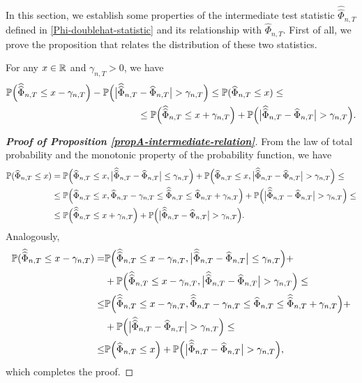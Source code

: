 \documentclass[a4paper,12pt]{article}
\newcommand{\doublehattwo}[1]{\widehat{\widehat{#1}}}
\begin{document}
In this section, we establish some properties of the intermediate test statistic $\doublehattwo{\Phi}_{n,T}$ defined in \eqref{Phi-doublehat-statistic} and its relationship with $\widehat{\Phi}_{n, T}$. First of all, we prove the proposition that relates the distribution of these two statistics.


\begin{propA}\label{propA-intermediate-relation}
For any $x \in \mathbb{R}$ and $\gamma_{n, T} > 0$, we have
\begin{align*} \pr\Big(\doublehattwo{\Phi}_{n,T} \le x - \gamma_{n, T}\Big) - \pr \Big(\big|\doublehattwo{\Phi}_{n,T} &- \widehat{\Phi}_{n,T}\big| > \gamma_{n, T} \Big)\le \pr(\widehat{\Phi}_{n, T} \le x) \le \\
&\le\pr\Big(\doublehattwo{\Phi}_{n,T} \le x + \gamma_{n, T}\Big) + \pr \Big(\big|\doublehattwo{\Phi}_{n,T} - \widehat{\Phi}_{n,T}\big| > \gamma_{n, T} \Big).
\end{align*}
\end{propA}

\begin{proof}[\textnormal{\textbf{Proof of Proposition \ref{propA-intermediate-relation}}}] 
From the law of total probability and the monotonic property of the probability function, we have
\begin{align*} \pr(\widehat{\Phi}_{n, T} \le x) &= \pr \Big(\widehat{\Phi}_{n, T} \le x, \big|\doublehattwo{\Phi}_{n,T} - \widehat{\Phi}_{n,T}\big| \le \gamma_{n, T} \Big) + \pr \Big(\widehat{\Phi}_{n, T} \le x, \big|\doublehattwo{\Phi}_{n,T} - \widehat{\Phi}_{n,T}\big| > \gamma_{n, T} \Big) \le \\
& \le  \pr \Big(\widehat{\Phi}_{n, T} \le x, \widehat{\Phi}_{n,T} - \gamma_{n, T} \le \doublehattwo{\Phi}_{n,T} \le \widehat{\Phi}_{n,T} + \gamma_{n, T} \Big) + \pr \Big(\big|\doublehattwo{\Phi}_{n,T} - \widehat{\Phi}_{n,T}\big| > \gamma_{n, T} \Big) \le \\
& \le  \pr \Big(\doublehattwo{\Phi}_{n,T} \le x + \gamma_{n, T} \Big) + \pr \Big(\big|\doublehattwo{\Phi}_{n,T} - \widehat{\Phi}_{n,T}\big| > \gamma_{n, T} \Big).
\end{align*}
Analogously, 
\begin{align*} \pr(\doublehattwo{\Phi}_{n, T} \le x - \gamma_{n, T}) =& \pr \Big(\doublehattwo{\Phi}_{n, T} \le x - \gamma_{n, T}, \big|\doublehattwo{\Phi}_{n,T} - \widehat{\Phi}_{n,T}\big| \le \gamma_{n, T} \Big) +\\
&+ \pr \Big(\doublehattwo{\Phi}_{n, T} \le x - \gamma_{n, T}, \big|\doublehattwo{\Phi}_{n,T} - \widehat{\Phi}_{n,T}\big| > \gamma_{n, T} \Big) \le \\
 \le&  \pr \Big(\doublehattwo{\Phi}_{n, T} \le x - \gamma_{n, T}, \doublehattwo{\Phi}_{n, T} - \gamma_{n, T} \le \widehat{\Phi}_{n,T} \le \doublehattwo{\Phi}_{n, T} + \gamma_{n, T} \Big) +\\
 &+  \pr \Big(\big|\doublehattwo{\Phi}_{n,T} - \widehat{\Phi}_{n,T}\big| > \gamma_{n, T} \Big) \le \\
 \le &  \pr \Big(\widehat{\Phi}_{n,T} \le x \Big) + \pr \Big(\big|\doublehattwo{\Phi}_{n,T} - \widehat{\Phi}_{n,T}\big| > \gamma_{n, T} \Big),
\end{align*}
which completes the proof.
\end{proof}
\end{document}
